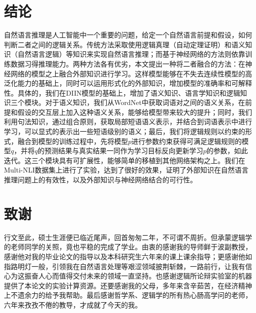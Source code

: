 \documentclass[UTF8,11pt,a4paper,nofonts]{ctexart}
\begin{document}






\section{结论}

自然语言推理是人工智能中一个重要的问题，给定一个自然语言前提和假设，如何判断二者之间的逻辑关系。传统方法采取使用逻辑真理（自动定理证明）和语义知识（自然语言逻辑）等知识来实现自然语言推理；而基于神经网络的方法则依靠训练数据习得推理能力。两种方法各有优劣，本文提出一种将二者融合的方法：在神经网络的模型之上融合外部知识进行学习。这样模型能够在不失去连续性模型的高泛化能力的基础上，同时可以运用形式化的外部知识，增加模型的准确率和可解释性。具体的，我们在DIIN模型的基础上，增加了语义知识、语言学知识和逻辑知识三个模块。对于语义知识，我们从WordNet中获取词语对之间的语义关系，在前提和假设的交互层上加入这种语义关系，能够给模型带来较大的提升；同时，我们利用句法知识，通过组合原则，获取局部短语语义表示，并结合到词语表示中进行学习，可以显式的表示出一些短语级别的语义；最后，我们将逻辑规则以约束的形式，融合到模型的训练过程中，先将模型$p$进行参数约束获得可满足逻辑规则的模型$q$，并将$q$的预测结果与真实结果一同作为学习目标反向更新学习$p$的参数，如此迭代。这三个模块具有可扩展性，能够简单的移植到其他网络架构之上。我们在Multi-NLI数据集上进行了实验，达到了很好的效果，证明了外部知识在自然语言推理问题上的有效性，以及外部知识与神经网络结合的可行性。

\section{致谢}

行文至此，硕士生涯便已临近尾声，回首匆匆二年，不可谓不周折。但承蒙逻辑学的老师同学的关照，竟也平稳的完成了学业。由衷的感谢我的导师鲜于波副教授，感谢他对我的毕业论文的指导以及本科研究生六年来的课上课余指导；更感谢他如指路明灯一般，引领我在自然语言处理等艰涩领域披荆斩棘，一路前行，让我有信心为这振奋人心而值得交付未来的领域一直坚持。也感谢逻辑所论辩实验室的机器提供了本论文的实验计算资源。还要感谢我的父母，多年来含辛茹苦，在经济精神上不遗余力的给予我帮助。最后感谢哲学系、逻辑学的所有热心肠高学问的老师，六年来孜孜不倦的教导，才成就了今天的我。

\newpage
{}

\end{document}
